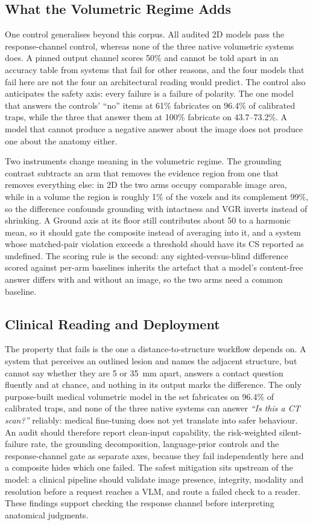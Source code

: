 \subsection{What the Volumetric Regime Adds}

One control generalises beyond this corpus. All audited 2D models pass the response-channel control, whereas none of the three native
volumetric systems does. A pinned output channel scores
50\% and cannot be told apart in an accuracy table from systems that fail
for other reasons, and the four models that fail here are not the four an
architectural reading would predict. The control also
anticipates the safety axis: every
failure is a failure of polarity. The one model that answers the controls'
``no'' items at 61\% fabricates on 96.4\% of calibrated traps, while the
three that answer them at 100\% fabricate on 43.7--73.2\%. A model that cannot produce a negative
answer about the image does not produce one about the anatomy either.

Two instruments change meaning in the volumetric regime. The grounding
contrast subtracts an arm that removes the evidence region from one that
removes everything else: in 2D the two arms occupy comparable image area,
while in a volume the region is roughly 1\% of the voxels and its complement
99\%, so the difference confounds grounding with intactness and VGR inverts
instead of shrinking. A Ground axis at its floor still contributes about 50
to a harmonic mean, so it should gate the composite instead of averaging
into it, and a system whose matched-pair violation exceeds a threshold
should have its CS reported as undefined. The scoring rule is the second:
any sighted-versus-blind difference scored against per-arm baselines
inherits the artefact that a model's content-free answer differs with and
without an image, so the two arms need a common baseline.

\subsection{Clinical Reading and Deployment}

The property that fails is the one a distance-to-structure workflow depends
on. A system that perceives an outlined lesion and names the adjacent
structure, but cannot say whether they are 5 or 35~mm apart, answers a
contact question fluently and at chance, and nothing in its output marks the
difference. The only purpose-built medical volumetric model in the set
fabricates on 96.4\% of calibrated traps, and none of the three native
systems can answer \emph{``Is this a CT scan?''} reliably: medical
fine-tuning does not yet translate into safer behaviour. An audit should
therefore report clean-input capability, the risk-weighted silent-failure
rate, the grounding decomposition, language-prior controls and the
response-channel gate as separate axes, because they fail independently
here and a composite hides which one failed.
The safest mitigation sits upstream of the model: a clinical pipeline should
validate image presence, integrity, modality and resolution before a request
reaches a VLM, and route a failed check to a reader. These findings support checking the response channel before interpreting anatomical judgments.

